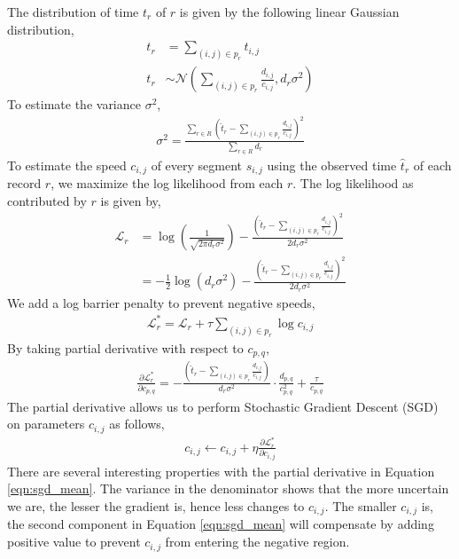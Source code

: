 \documentclass[conference]{IEEEtran.1.8}
\begin{document}
The distribution of time $t_r$ of $r$ is given by the following linear Gaussian distribution,
\begin{align*}
	t_r &= \sum_{ (i,j) \in p_r } t_{i,j} \\
	t_r &\sim \mathcal{N} \left( \sum_{ (i,j) \in p_r } \frac{ d_{i,j} }{ c_{i,j} }, d_r \sigma^2 \right)
\end{align*}
To estimate the variance $\sigma^2$,
\begin{align*}
	\sigma^2 = \frac{ \sum_{r \in R} \left( \hat{t}_r - \sum_{ (i,j) \in p_r } \frac{d_{i,j}}{c_{i,j}} \right)^2}{\sum_{r \in R} d_r}
\end{align*}
To estimate the speed $c_{i,j}$ of every segment $s_{i,j}$ using the observed time $\hat{t}_r$ of each record $r$, we maximize the log likelihood from each $r$. The log likelihood as contributed by $r$ is given by,
\begin{align*}
	\mathcal{L}_r &= \log \left( \frac{1}{\sqrt{2 \pi d_r \sigma^2 }} \right) - \frac{\left( \hat{t}_r - \sum_{ (i,j) \in p_r } \frac{d_{i,j}}{c_{i,j}} \right)^2}{2 d_r \sigma^2 } \\
	&= - \frac{1}{2} \log \left( d_r \sigma^2 \right) - \frac{\left( \hat{t}_r - \sum_{ (i,j) \in p_r } \frac{d_{i,j}}{c_{i,j}} \right)^2}{2 d_r \sigma^2 }
\end{align*}
We add a log barrier penalty to prevent negative speeds,
\begin{align}
	\label{eqn:objective1}
	\mathcal{L}^*_r = \mathcal{L}_r + \tau \sum_{(i,j) \in p_r} \log c_{i,j}
\end{align}
By taking partial derivative with respect to $c_{p,q}$,
\begin{align}
	\label{eqn:sgd_mean}
	\frac{\partial \mathcal{L}^*_r}{\partial c_{p,q}} = - \frac{\left( \hat{t}_r - \sum_{ (i,j) \in p_r } \frac{d_{i,j}}{c_{i,j}} \right)}{d_r \sigma^2 } \cdot \frac{d_{p,q}}{c_{p,q}^2} + \frac{\tau}{c_{p,q}}
\end{align}
The partial derivative allows us to perform Stochastic Gradient Descent (SGD) on parameters $c_{i,j}$ as follows,
\begin{align*}
	c_{i,j} \leftarrow c_{i,j} + \eta \frac{\partial \mathcal{L}^*_r}{\partial c_{i,j}}
\end{align*}
There are several interesting properties with the partial derivative in Equation \ref{eqn:sgd_mean}. The variance in the denominator shows that the more uncertain we are, the lesser the gradient is, hence less changes to $c_{i,j}$. The smaller $c_{i,j}$ is, the second component in Equation \ref{eqn:sgd_mean} will compensate by adding positive value to prevent $c_{i,j}$ from entering the negative region.
\end{document}
